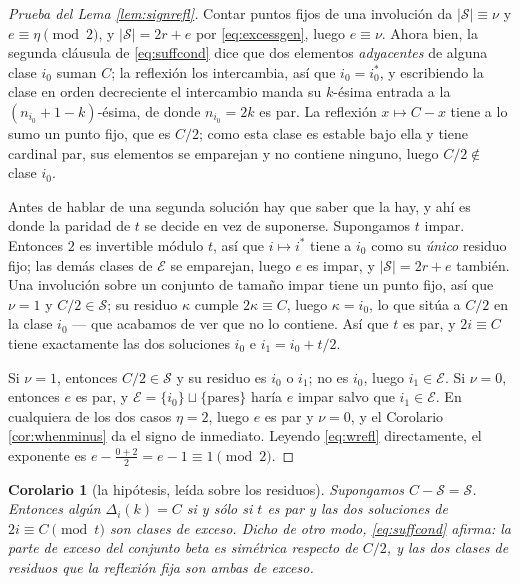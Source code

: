 \documentclass[11pt,reqno]{amsart}
\theoremstyle{plain}
\newtheorem{corollary}[theorem]{Corolario}
\theoremstyle{definition}
\begin{document}
\begin{proof}[Prueba del Lema \ref{lem:signrefl}]
Contar puntos fijos de una involución da $|\mathcal{S}|\equiv\nu$ y $e\equiv\eta \pmod 2$, y
$|\mathcal{S}|=2r+e$ por \eqref{eq:excessgen}, luego $e\equiv\nu$. Ahora bien, la segunda cláusula de
\eqref{eq:suffcond} dice que dos elementos \emph{adyacentes} de alguna clase $i_0$ suman $C$; la
reflexión los intercambia, así que $i_0=i_0^{*}$, y escribiendo la clase en orden decreciente el
intercambio manda su $k$-ésima entrada a la $(n_{i_0}+1-k)$-ésima, de donde $n_{i_0}=2k$ es par. La
reflexión $x\mapsto C-x$ tiene a lo sumo un punto fijo, que es $C/2$; como esta clase es estable bajo
ella y tiene cardinal par, sus elementos se emparejan y no contiene ninguno, luego $C/2\notin$ clase
$i_0$.

Antes de hablar de una segunda solución hay que saber que la hay, y ahí es donde la paridad de $t$ se
decide en vez de suponerse. Supongamos $t$ impar. Entonces $2$ es invertible módulo $t$, así que
$i\mapsto i^{*}$ tiene a $i_0$ como su \emph{único} residuo fijo; las demás clases de $\mathcal{E}$ se
emparejan, luego $e$ es impar, y $|\mathcal{S}|=2r+e$ también. Una involución sobre un conjunto de
tamaño impar tiene un punto fijo, así que $\nu=1$ y $C/2\in\mathcal{S}$; su residuo $\kappa$ cumple
$2\kappa\equiv C$, luego $\kappa=i_0$, lo que sitúa a $C/2$ en la clase $i_0$ --- que acabamos de ver
que no lo contiene. Así que $t$ es par, y $2i\equiv C$ tiene exactamente las dos soluciones $i_0$ e
$i_1=i_0+t/2$.

Si $\nu=1$, entonces $C/2\in\mathcal{S}$ y su residuo es $i_0$ o $i_1$; no es $i_0$, luego
$i_1\in\mathcal{E}$. Si $\nu=0$, entonces $e$ es par, y $\mathcal{E}=\{i_0\}\sqcup\{\text{pares}\}$
haría $e$ impar salvo que $i_1\in\mathcal{E}$. En cualquiera de los dos casos $\eta=2$, luego $e$ es
par y $\nu=0$, y el Corolario \ref{cor:whenminus} da el signo de inmediato. Leyendo \eqref{eq:wrefl}
directamente, el exponente es $e-\tfrac{0+2}2=e-1\equiv1 \pmod 2$.
\end{proof}

\begin{corollary}[la hipótesis, leída sobre los residuos]\label{cor:suffgeom}
Supongamos $C-\mathcal{S}=\mathcal{S}$. Entonces algún $\Delta_i(k)=C$ si y sólo si $t$ es par y
\emph{las dos} soluciones de $2i\equiv C \pmod t$ son clases de exceso. Dicho de otro modo,
\eqref{eq:suffcond} afirma: la parte de exceso del conjunto beta es simétrica respecto de $C/2$, y las
dos clases de residuos que la reflexión fija son ambas de exceso.
\end{corollary}
\end{document}
